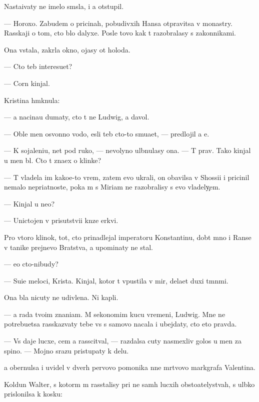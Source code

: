 \documentclass[10pt]{book}
\begin{document}
Nasta{\y}ivaty ne imelo sm{\yi}sla, i {\y}a otstupil.

— Horoxo. Zabudem o pricinah, pobudivxih Hansa otpravitsa v monast{\yi}ry. Rasskaji o tom, cto b{\yi}lo dalyxe. Posle tovo kak t{\yi} razobralasy s zakonnikami.

Ona vstala, zakr{\yi}la okno, {\y}ojasy ot holoda.

— Cto teb{\ia} interesu{\y}et?

—  Corn{\yi}{\y} kinjal.

Kristina hm{\yi}knula:

— {\Y}a nacina{\y}u dumaty, cto t{\yi} ne Ludwig, a d{\y}avol.

— Oble{\y} men{\ia} osv{\ia}{\x}onno{\y} vodo{\y}, {\y}esli teb{\ia} cto-to smu{\x}a{\y}et, — predlojil {\y}a {\y}e{\y}.

— K sojaleni{\y}u, net pod ruko{\y}, — nevolyno ul{\yi}bnulasy ona. — T{\yi} prav. Tako{\y} kinjal u men{\ia} b{\yi}l. Cto t{\yi} zna{\y}ex o klinke?

— T{\yi} vladela im kako{\y}e-to vrem{\ia}, zatem {\y}evo ukrali, on ob{\y}avilsa v Shossi{\y}i i pricinil nemalo nepri{\y}atnoste{\y}, poka m{\yi} s Miriam ne razobralisy s {\y}evo vladely{\c}em.

— Kinjal u ne{\y}o?

— Unictojen v prisutstvi{\y}i kn{\ia}ze{\y} {\C}erkvi.

Pro vtoro{\y} klinok, tot, cto prinadlejal imperatoru Konstantinu, dob{\yi}t{\yi}{\y} mno{\y} i Ranse v ta{\y}nike prejnevo Bratstva, {\y}a upominaty ne stal.

— {\Y}e{\x}o cto-nibudy?

— Su{\x}i{\y}e meloci, Krista. Kinjal, kotor{\yi}{\y} t{\yi} v{\yi}pustila v mir, dela{\y}et duxi t{\e}mn{\yi}mi.

Ona b{\yi}la nicuty ne udivlena. Ni kapli.

— {\Y}a rada tvo{\y}im znani{\y}am. M{\yi} sekonomim kucu vremeni, Ludwig. Mne ne potrebu{\y}etsa rasskaz{\yi}vaty tebe vs{\e} s samovo nacala i ubejdaty, cto eto pravda.

— Vs{\e} daje lucxe, cem {\y}a rasscit{\yi}val, — razdalsa cuty nasmexliv{\yi}{\y} golos u men{\ia} za spino{\y}. — Mojno srazu pristupaty k delu.

{\Y}a obernulsa i uvidel v dver{\ia}h pervovo pomo{\x}nika n{\yi}ne m{\e}rtvovo markgrafa Valentina.

Koldun Walter, s kotor{\yi}m m{\yi} rasstalisy pri ne sam{\yi}h lucxih obsto{\y}atelystvah, s ul{\yi}bko{\y} prislonilsa k kos{\ia}ku:
\end{document}
